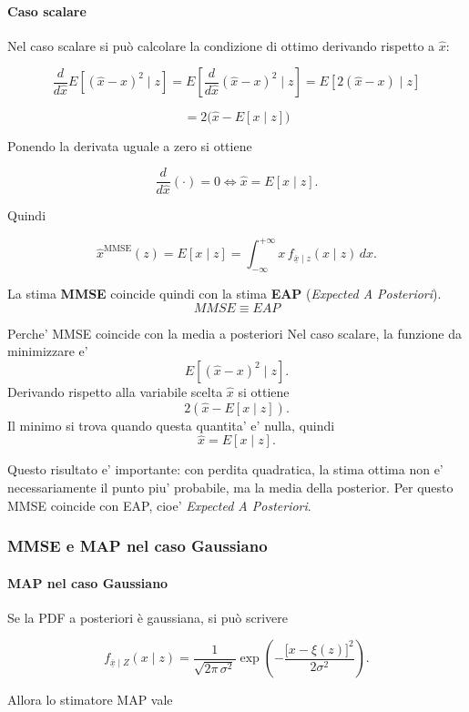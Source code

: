 \documentclass[11pt,a4paper]{article}
\begin{document}
\paragraph{Caso scalare}
Nel caso scalare si può calcolare la condizione di ottimo derivando rispetto a \(\hat x\):

\[
\frac{d}{d\hat x}
E\!\left[(\hat x-x)^2 \mid z\right]
=
E\!\left[\frac{d}{d\hat x}(\hat x-x)^2 \mid z\right]
=
E\!\left[2(\hat x-x)\mid z\right]
\]

\[
=
2\bigl(\hat x-E[x\mid z]\bigr)
\]

Ponendo la derivata uguale a zero si ottiene

\[
\frac{d}{d\hat x}(\cdot)=0
\iff
\hat x=E[x\mid z].
\]

Quindi

\[
\hat x^{\mathrm{MMSE}}(z)=E[x\mid z]
=
\int_{-\infty}^{+\infty} x\,f_{\overline{\underline{x}}\mid z}(x\mid z)\,dx.
\]

La stima \textbf{MMSE} coincide quindi con la stima \textbf{EAP}
(\emph{Expected A Posteriori}).
\[
MMSE \equiv EAP
\]

\begin{spiegazione}{Perche' MMSE coincide con la media a posteriori}
Nel caso scalare, la funzione da minimizzare e'
\[
E[(\hat x-x)^2\mid z].
\]
Derivando rispetto alla variabile scelta $\hat x$ si ottiene
\[
2(\hat x-E[x\mid z]).
\]
Il minimo si trova quando questa quantita' e' nulla, quindi
\[
\hat x=E[x\mid z].
\]

Questo risultato e' importante: con perdita quadratica, la stima ottima non e' necessariamente il punto piu' probabile, ma la media della posterior. Per questo MMSE coincide con EAP, cioe' \emph{Expected A Posteriori}.
\end{spiegazione}

\subsubsection*{MMSE e MAP nel caso Gaussiano}

\paragraph{MAP nel caso Gaussiano}
Se la PDF a posteriori è gaussiana, si può scrivere

\[
f_{\overline{\underline{x}}\mid Z}(x\mid z)
=
\frac{1}{\sqrt{2\pi\,\sigma^2}}
\exp\!\left(
-\frac{\bigl[x-\xi(z)\bigr]^2}{2\sigma^2}
\right).
\]

Allora lo stimatore MAP vale
\end{document}
